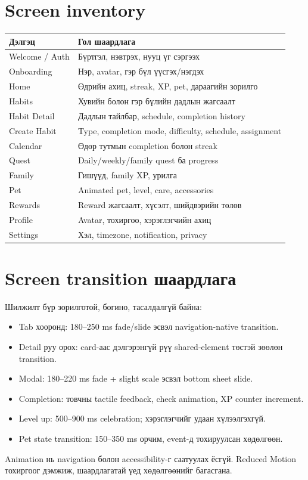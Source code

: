 \documentclass[12pt,a4paper,oneside]{report}
\begin{document}
\section{Screen inventory}
\begin{longtable}{p{}p{}}
\toprule
\textbf{Дэлгэц} & \textbf{Гол шаардлага}\\
\midrule
Welcome / Auth & Бүртгэл, нэвтрэх, нууц үг сэргээх\\
Onboarding & Нэр, avatar, гэр бүл үүсгэх/нэгдэх\\
Home & Өдрийн ахиц, streak, XP, pet, дараагийн зорилго\\
Habits & Хувийн болон гэр бүлийн дадлын жагсаалт\\
Habit Detail & Дадлын тайлбар, schedule, completion history\\
Create Habit & Type, completion mode, difficulty, schedule, assignment\\
Calendar & Өдөр тутмын completion болон streak\\
Quest & Daily/weekly/family quest ба progress\\
Family & Гишүүд, family XP, урилга\\
Pet & Animated pet, level, care, accessories\\
Rewards & Reward жагсаалт, хүсэлт, шийдвэрийн төлөв\\
Profile & Avatar, тохиргоо, хэрэглэгчийн ахиц\\
Settings & Хэл, timezone, notification, privacy\\
\bottomrule
\end{longtable}

\section{Screen transition шаардлага}
Шилжилт бүр зорилготой, богино, тасалдалгүй байна:
\begin{itemize}
  \item Tab хооронд: 180--250 ms fade/slide эсвэл navigation-native transition.
  \item Detail руу орох: card-аас дэлгэрэнгүй рүү shared-element төстэй зөөлөн transition.
  \item Modal: 180--220 ms fade + slight scale эсвэл bottom sheet slide.
  \item Completion: товчны tactile feedback, check animation, XP counter increment.
  \item Level up: 500--900 ms celebration; хэрэглэгчийг удаан хүлээлгэхгүй.
  \item Pet state transition: 150--350 ms орчим, event-д тохируулсан хөдөлгөөн.
\end{itemize}
Animation нь navigation болон accessibility-г саатуулах ёсгүй. Reduced Motion тохиргоог дэмжиж, шаардлагатай үед хөдөлгөөнийг багасгана.
\end{document}
